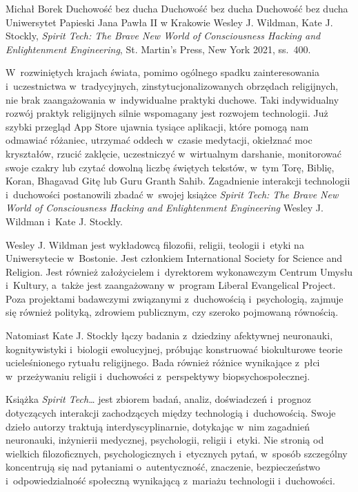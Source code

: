 \begin{newrevplenv}{Michał Borek}
	{Duchowość bez ducha}
	{Duchowość bez ducha}
	{Duchowość bez ducha}
	{Uniwersytet Papieski Jana Pawła II w Krakowie}
	{Wesley J. Wildman, Kate J. Stockly, \textit{Spirit Tech: The Brave New World of Consciousness Hacking and Enlightenment Engineering}, St. Martin's Press, New York 2021, ss.~400.}





\lettrine[loversize=0.13,lines=2,lraise=-0.03,nindent=0em,findent=0.2pt]%
{W}{}~rozwiniętych krajach świata, pomimo ogólnego spadku zainteresowania i~uczestnictwa w~tradycyjnych, zinstytucjonalizowanych obrzędach religijnych, nie brak zaangażowania w~indywidualne praktyki duchowe. Taki indywidualny rozwój praktyk religijnych silnie wspomagany jest rozwojem technologii. Już szybki przegląd App Store ujawnia tysiące aplikacji, które pomogą nam odmawiać różaniec, utrzymać oddech w~czasie medytacji, okiełznać moc kryształów, rzucić zaklęcie, uczestniczyć w~wirtualnym darshanie, monitorować swoje czakry lub czytać dowolną liczbę świętych tekstów, w~tym Torę, Biblię, Koran, Bhagavad Gitę lub Guru Granth Sahib. Zagadnienie interakcji technologii i~duchowości postanowili zbadać w~swojej książce \textit{Spirit Tech: The Brave New World of Consciousness Hacking and Enlightenment Engineering}
\parencite*[][]{wildman_spirit_2021} %
 Wesley J. Wildman i~Kate J. Stockly.

Wesley J. Wildman jest wykładowcą filozofii, religii, teologii i~etyki na Uniwersytecie w~Bostonie. Jest członkiem International Society for Science and Religion. Jest również założycielem i~dyrektorem wykonawczym Centrum Umysłu i~Kultury, a~także jest zaangażowany w~program Liberal Evangelical Project. Poza projektami badawczymi związanymi z~duchowością i~psychologią, zajmuje się również polityką, zdrowiem publicznym, czy szeroko pojmowaną równością.

Natomiast Kate J. Stockly łączy badania z~dziedziny afektywnej neuronauki, kognitywistyki i~biologii ewolucyjnej, próbując konstruować biokulturowe teorie ucieleśnionego rytuału religijnego. Bada również różnice wynikające z~płci w~przeżywaniu religii i~duchowości z~perspektywy biopsychospołecznej.

Książka \textit{Spirit Tech\ldots} jest zbiorem badań, analiz, doświadczeń i~prognoz dotyczących interakcji zachodzących między technologią i~duchowością. Swoje dzieło autorzy traktują interdyscyplinarnie, dotykając w~nim zagadnień neuronauki, inżynierii medycznej, psychologii, religii i~etyki. Nie stronią od wielkich filozoficznych, psychologicznych i~etycznych pytań, w~sposób szczególny koncentrują się nad pytaniami o~autentyczność, znaczenie, bezpieczeństwo i~odpowiedzialność społeczną wynikającą z~mariażu technologii i~duchowości.


\end{newrevplenv}
